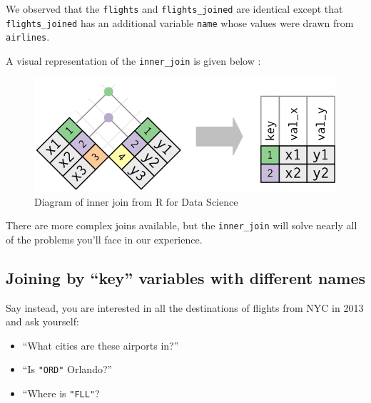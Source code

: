 \documentclass[12pt,]{krantz}
\makeatletter
\newenvironment{Shaded}{\begin{snugshade}}{\end{snugshade}}
\newcommand{\KeywordTok}[1]{\textcolor[rgb]{0.27,0.27,0.27}{\textbf{#1}}}
\newcommand{\DataTypeTok}[1]{\textcolor[rgb]{0.27,0.27,0.27}{#1}}
\newcommand{\StringTok}[1]{\textcolor[rgb]{0.5,0.5,0.5}{#1}}
\newcommand{\OperatorTok}[1]{\textcolor[rgb]{0.43,0.43,0.43}{\textbf{#1}}}
\newcommand{\NormalTok}[1]{#1}
\providecommand{\tightlist}{%
  \setlength{\itemsep}{0pt}\setlength{\parskip}{0pt}}
\newenvironment{kframe}{%
\medskip{}
\setlength{\fboxsep}{.8em}
 \def\at@end@of@kframe{}%
 \ifinner\ifhmode%
  \def\at@end@of@kframe{\end{minipage}}%
  \begin{minipage}{\columnwidth}%
 \fi\fi%
 \def\FrameCommand##1{\hskip\@totalleftmargin \hskip-\fboxsep
 \colorbox{shadecolor}{##1}\hskip-\fboxsep
     \hskip-\linewidth \hskip-\@totalleftmargin \hskip\columnwidth}%
 \MakeFramed {\advance\hsize-\width
   \@totalleftmargin\z@ \linewidth\hsize
   \@setminipage}}%
 {\par\unskip\endMakeFramed%
 \at@end@of@kframe}
\renewenvironment{Shaded}{\begin{kframe}}{\end{kframe}}
\makeatother
\begin{document}
\begin{Shaded}
\end{Shaded}

We observed that the \texttt{flights} and \texttt{flights\_joined} are
identical except that \texttt{flights\_joined} has an additional
variable \texttt{name} whose values were drawn from \texttt{airlines}.

A visual representation of the \texttt{inner\_join} is given below
\citep{rds2016}:

\begin{figure}

{\centering \includegraphics[width=\textwidth]{images/join-inner} 

}

\caption{Diagram of inner join from R for Data Science}\label{fig:ijdiagram}
\end{figure}

There are more complex joins available, but the \texttt{inner\_join}
will solve nearly all of the problems you'll face in our experience.

\subsection{\texorpdfstring{Joining by ``key'' variables with different
names}{Joining by key variables with different names}}\label{joining-by-key-variables-with-different-names}

Say instead, you are interested in all the destinations of flights from
NYC in 2013 and ask yourself:

\begin{itemize}
\tightlist
\item
  ``What cities are these airports in?''
\item
  ``Is \texttt{"ORD"} Orlando?''
\item
  ``Where is \texttt{"FLL"}?
\end{itemize}
\end{document}
